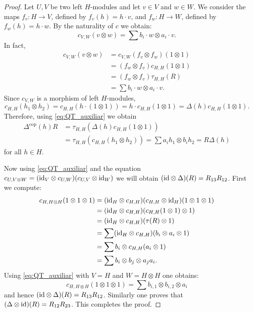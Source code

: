 \begin{proof}
Let $U,V$ be two left $H$-modules and let $v\in V$ and $w\in W$. We consider
the maps $f_v:H\to V$, defined by $f_v(h)=h\cdot v$, and $f_w:H\to W$, defined
by $f_w(h)=h\cdot w$. By the naturality of $c$ we obtain:
\begin{equation}
\label{eq:QT_auxiliar}
c_{V,W}(v\otimes w)=\sum b_{i}\cdot w\otimes a_{i}\cdot v.
\end{equation}
In fact, 
\begin{align*} 
c_{V,W}(v\otimes w) & =c_{V,W}(f_v\otimes f_w)(1\otimes1)\\
 & =(f_w\otimes f_v)c_{H,H}(1\otimes1)\\
 & =(f_w\otimes f_v)\tau_{H,H}(R)\\
 & =\sum b_{i}\cdot w\otimes a_{i}\cdot v.
\end{align*}
Since $c_{V,W}$ is a morphism of left $H$-modules, 
\[
c_{H,H}(h_1\otimes h_2)=c_{H,H}(h\cdot(1\otimes1))=h\cdot c_{H,H}(1\otimes1)=\Delta(h)c_{H,H}(1\otimes1).
\]
Therefore, using \eqref{eq:QT_auxiliar} we obtain 
\begin{align*}
\Delta^{\mathrm{cop}}(h)R &= \tau_{H,H}(\Delta(h)c_{H,H}(1\otimes1))\\
&=\tau_{H,H}(c_{H,H}(h_1\otimes h_2))=\sum a_ih_1\otimes b_ih_2=R\Delta(h)
\end{align*}
for all $h\in H$. 

Now using \eqref{eq:QT_auxiliar} and the equation $c_{U,V\otimes
W}=(\mathrm{id}_{V}\otimes c_{U,W})(c_{U,V}\otimes\mathrm{id}_{W})$ we will
obtain $(\mathrm{id}\otimes\Delta)(R)=R_{13}R_{12}$. First we compute:
\begin{align*}
c_{H,H\otimes H}(1\otimes1\otimes1) & =(\mathrm{id}_{H}\otimes c_{H,H})(c_{H,H}\otimes\mathrm{id}_{H})(1\otimes1\otimes1)\\
 & =(\mathrm{id}_{H}\otimes c_{H,H})(c_{H,H}(1\otimes1)\otimes1)\\
 & =(\mathrm{id}_{H}\otimes c_{H,H})(\tau(R)\otimes1)\\
 & =\sum(\mathrm{id}_{H}\otimes c_{H,H})(b_{i}\otimes a_{i}\otimes1)\\
 & =\sum b_{i}\otimes c_{H,H}(a_{i}\otimes1)\\
 & =\sum b_{i}\otimes b_{j}\otimes a_{j}a_{i}.
\end{align*}
Using \eqref{eq:QT_auxiliar} with $V=H$ and $W=H\otimes H$ one obtains:
\[
c_{H,H\otimes H}(1\otimes1\otimes1)=\sum b_{i,1}\otimes b_{i,2}\otimes a_{i}
\]
and hence $(\mathrm{id}\otimes\Delta)(R)=R_{13}R_{12}$.  Similarly one proves
that $(\Delta\otimes\mathrm{id})(R)=R_{12}R_{23}$. This completes the proof. 
\end{proof}

